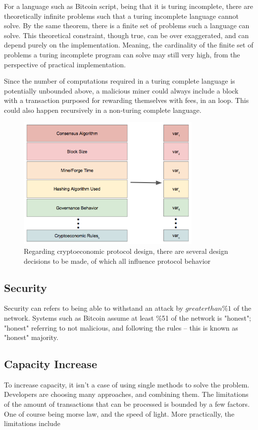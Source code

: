 \documentclass[12pt, titlepage, twocolumn]{report}
\begin{document}
For a language such as Bitcoin script, being that it is turing incomplete, there are theoretically infinite problems such that a turing incomplete language cannot solve. By the same theorem, there is a finite set of problems such a language can solve. This theoretical constraint, though true, can be over exaggerated, and can depend purely on the implementation. Meaning, the cardinality of the finite set of problems a turing incomplete program can solve may still very high, from the perspective of practical implementation. 

Since the number of computations required in a turing complete language is potentially unbounded above, a malicious miner could always include a block with a transaction purposed for rewarding themselves with fees, in an loop. This could also happen recursively in a non-turing complete language.

\begin{figure}[ht]
\centering
	\includegraphics[width=0.8\textwidth]{reasons_modularity}
	\caption{Regarding cryptoeconomic protocol design, there are several design decisions to be made, of which all influence protocol behavior}
	\label{reasons_modularity}
\end{figure}

\subsection{Security}
Security can refers to being able to withstand an attack by \(greater than\%1\) of the network. Systems such as Bitcoin assume at least \%51 of the network is "honest"; "honest" referring to not malicious, and following the rules -- this is known as "honest" majority.

\subsection{Capacity Increase}
To increase capacity, it isn't a case of using single methods to solve the problem. Developers are choosing many approaches, and combining them. The limitations of the amount of transactions that can be processed is bounded by a few factors. One of course being morse law, and the speed of light. More practically, the limitations include
\end{document}
